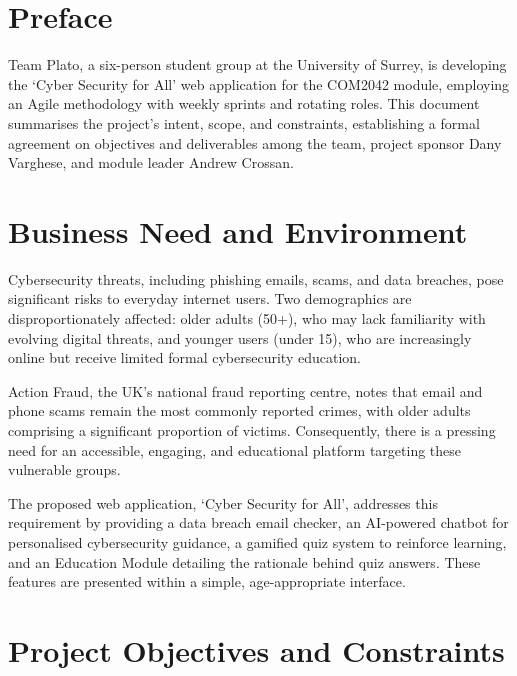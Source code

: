 \documentclass[11pt, a4paper]{report}
\begin{document}
\section{Preface}
Team Plato, a six-person student group at the University of Surrey, is developing the `Cyber Security for All' web application for the COM2042 module, employing an Agile methodology with weekly sprints and rotating roles. This document summarises the project's intent, scope, and constraints, establishing a formal agreement on objectives and deliverables among the team, project sponsor Dany Varghese, and module leader Andrew Crossan.

\section{Business Need and Environment}
Cybersecurity threats, including phishing emails, scams, and data breaches, pose significant risks to everyday internet users. Two demographics are disproportionately affected: older adults (50+), who may lack familiarity with evolving digital threats, and younger users (under 15), who are increasingly online but receive limited formal cybersecurity education. 

Action Fraud, the UK’s national fraud reporting centre, notes that email and phone scams remain the most commonly reported crimes, with older adults comprising a significant proportion of victims. Consequently, there is a pressing need for an accessible, engaging, and educational platform targeting these vulnerable groups.

The proposed web application, `Cyber Security for All', addresses this requirement by providing a data breach email checker, an AI-powered chatbot for personalised cybersecurity guidance, a gamified quiz system to reinforce learning, and an Education Module detailing the rationale behind quiz answers. These features are presented within a simple, age-appropriate interface.

\section{Project Objectives and Constraints}
\end{document}
